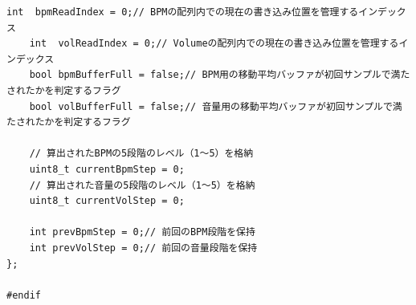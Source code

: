 \begin{lstlisting}[caption={PotManager.h}, label={lst:siki_pot_h}]
    int  bpmReadIndex = 0;// BPMの配列内での現在の書き込み位置を管理するインデックス
    int  volReadIndex = 0;// Volumeの配列内での現在の書き込み位置を管理するインデックス
    bool bpmBufferFull = false;// BPM用の移動平均バッファが初回サンプルで満たされたかを判定するフラグ
    bool volBufferFull = false;// 音量用の移動平均バッファが初回サンプルで満たされたかを判定するフラグ

    // 算出されたBPMの5段階のレベル（1～5）を格納
    uint8_t currentBpmStep = 0; 
    // 算出された音量の5段階のレベル（1～5）を格納
    uint8_t currentVolStep = 0; 
    
    int prevBpmStep = 0;// 前回のBPM段階を保持
    int prevVolStep = 0;// 前回の音量段階を保持
};

#endif
\end{lstlisting}

